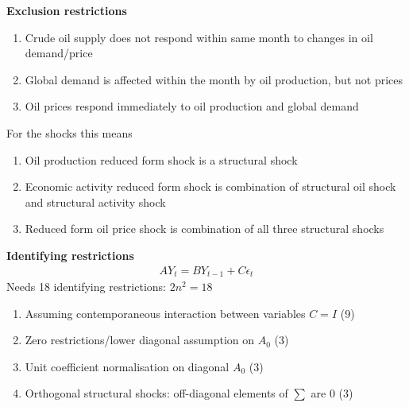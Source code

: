 \documentclass{beamer}
\begin{document}
\begin{frame}
  \textbf{Exclusion restrictions}
  \begin{enumerate}
    \item Crude oil supply does not respond within same month to changes in oil demand/price
    \item Global demand is affected within the month by oil production, but not prices
    \item Oil prices respond immediately to oil production and global demand
  \end{enumerate}
  \medskip
  For the shocks this means
  \begin{enumerate}
  \item Oil production reduced form shock is a structural shock
  \item Economic activity reduced form shock is combination of structural oil shock and structural activity shock
  \item Reduced form oil price shock is combination of all three structural shocks
\end{enumerate}
\end{frame}

\begin{frame}
  \textbf{Identifying restrictions}
\begin{align*}
  AY_t=BY_{t-1} + C\epsilon_t
\end{align*}
 \medskip
 Needs 18 identifying restrictions: $2n^2=18$
 \begin{enumerate}
   \item Assuming contemporaneous interaction between variables $C=I$ (9)
   \item Zero restrictions/lower diagonal assumption on $A_0$ (3)
   \item Unit coefficient normalisation on diagonal $A_0$ (3)
   \item Orthogonal structural shocks: off-diagonal elements of $\sum$ are 0 (3)
 \end{enumerate}
\end{frame}
\end{document}
